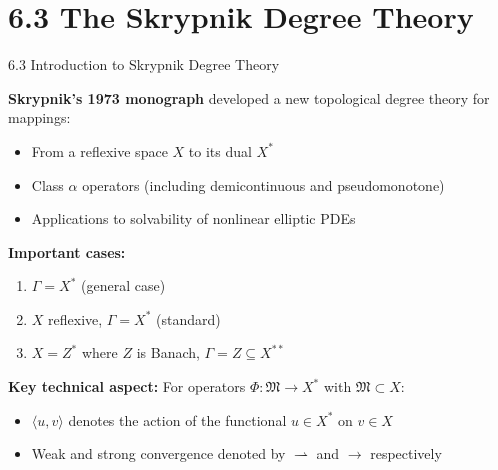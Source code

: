 \documentclass[aspectratio=169,10pt]{beamer}
\begin{document}
\section{6.3 The Skrypnik Degree Theory}

\begin{frame}{6.3 Introduction to Skrypnik Degree Theory}

\textbf{Skrypnik's 1973 monograph} developed a new topological degree theory for mappings:
\begin{itemize}
    \item From a reflexive space $X$ to its dual $X^*$
    \item Class $\alpha$ operators (including demicontinuous and pseudomonotone)
    \item Applications to solvability of nonlinear elliptic PDEs
\end{itemize}

\vspace{0.3cm}

\textbf{Important cases:}
\begin{enumerate}
    \item $\Gamma = X^*$ (general case)
    \item $X$ reflexive, $\Gamma = X^*$ (standard)
    \item $X = Z^*$ where $Z$ is Banach, $\Gamma = Z \subseteq X^{**}$
\end{enumerate}

\vspace{0.4cm}

\textbf{Key technical aspect:} For operators $\Phi: \mathfrak{M} \to X^*$ with $\mathfrak{M} \subset X$:
\begin{itemize}
    \item $\langle u, v \rangle$ denotes the action of the functional $u \in X^*$ on $v \in X$
    \item Weak and strong convergence denoted by $\rightharpoonup$ and $\to$ respectively
\end{itemize}

\end{frame}
\end{document}

